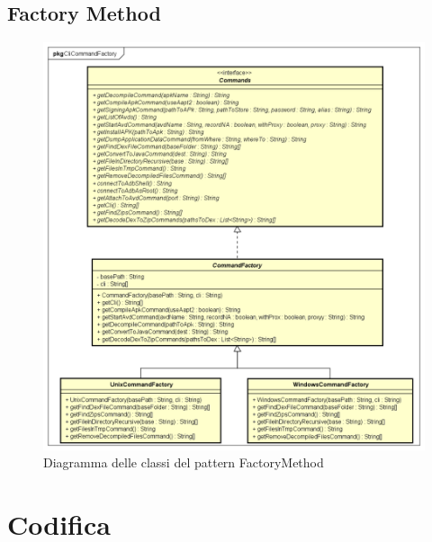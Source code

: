 \subsection{Factory Method}\label{subsec:factory-method}
\begin{figure}[H]
    \centering
    \includegraphics[width=14cm, height=12cm]{./immagini/diagrammi_uml/CommandFactory.png}
    \caption{Diagramma delle classi del pattern FactoryMethod}\label{fig:factory-method}
\end{figure}
\section{Codifica}\label{sec:codifica}

